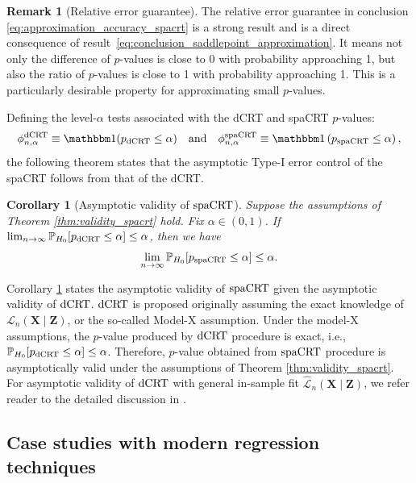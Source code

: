 \documentclass[12pt]{article}
\newtheorem{corollary}{Corollary}
\theoremstyle{definition}
\newtheorem{remark}{Remark}
\def\P{\mathbb{P}}
\def\P{\mathbb{P}}
\renewcommand{\P}{\mathbb{P}}							%
\newcommand{\indicator}{\mathbbm 1}						%
\newcommand{\prx}{\bm X}								%
\newcommand{\prz}{\bm Z}								%
\newcommand{\law}{\mathcal L}							%
\newcommand{\lawhat}{\widehat{\mathcal L}}				%
\newcommand{\dCRT}{\textnormal{dCRT}} 					%
\newcommand{\spacrt}{\textnormal{spaCRT}}               %
\begin{document}
  
  \begin{remark}[Relative error guarantee]
	  The relative error guarantee in conclusion \eqref{eq:approximation_accuracy_spacrt} is a strong result and is a direct consequence of result~\eqref{eq:conclusion_saddlepoint_approximation}. It means not only the difference of $p$-values is close to $0$ with probability approaching 1, but also the ratio of $p$-values is close to 1 with probability approaching 1. This is a particularly desirable property for approximating small $p$-values.
  \end{remark}
  
  Defining the level-$\alpha$ tests associated with the dCRT and spaCRT $p$-values:
  \begin{align*}
  \phi^{\dCRT}_{n,\alpha} \equiv \indicator(p_{\dCRT} \leq \alpha) \quad \text{and} \quad	\phi^{\spacrt}_{n,\alpha}\equiv \indicator\left(p_{\spacrt} \leq \alpha\right),
  \end{align*}
  the following theorem states that the asymptotic Type-I error control of the spaCRT follows from that of the dCRT.
  
  \begin{corollary}[Asymptotic validity of $\spacrt$]\label{cor:asymptotic_validity_spacrt}
	Suppose the assumptions of Theorem \ref{thm:validity_spacrt} hold. Fix $\alpha\in (0,1)$. If $\lim_{n\rightarrow\infty}\P_{H_0}[p_{\dCRT}\leq \alpha]\leq \alpha$, then we have 
	\begin{align*}
	  \lim_{n\rightarrow\infty}\P_{H_0}[p_{\spacrt}\leq \alpha]\leq \alpha.
	\end{align*}
  \end{corollary}
  Corollary \ref{cor:asymptotic_validity_spacrt} states the asymptotic validity of $\spacrt$ given the asymptotic validity of $\dCRT$. $\dCRT$ is proposed originally assuming the exact knowledge of $\law_n(\prx\mid\prz)$, or the so-called Model-X assumption. Under the model-X assumptions, the $p$-value produced by $\dCRT$ procedure is exact, i.e., $\P_{H_0}[p_{\dCRT}\leq \alpha]\leq \alpha$. Therefore, $p$-value obtained from $\spacrt$ procedure is asymptotically valid under the assumptions of Theorem \ref{thm:validity_spacrt}. For asymptotic validity of $\dCRT$ with general in-sample fit $\lawhat_n(\prx\mid\prz)$, we refer reader to the detailed discussion in \citet{Niu2022a}.
  
  \subsection{Case studies with modern regression techniques}\label{sec:case_study}
  
\end{document}
